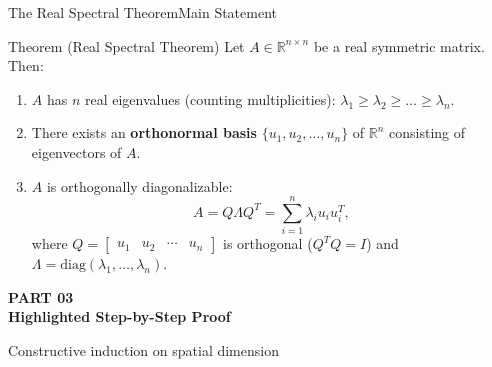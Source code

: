 \documentclass[10pt, aspectratio=169]{beamer}
\newcommand{\hl}[1]{{\color{amber}\textbf{#1}}}
\begin{document}
\begin{frame}{The Real Spectral Theorem}{Main Statement}
  \begin{maththeorem}{Theorem (Real Spectral Theorem)}
    Let $A \in \mathbb{R}^{n \times n}$ be a real symmetric matrix. Then:
    \begin{enumerate}
      \item $A$ has $n$ real eigenvalues (counting multiplicities): $\lambda_1 \ge \lambda_2 \ge \dots \ge \lambda_n$.
      \item There exists an \hl{orthonormal basis} $\{u_1, u_2, \dots, u_n\}$ of $\mathbb{R}^n$ consisting of eigenvectors of $A$.
      \item $A$ is orthogonally diagonalizable:
      \[
        A = Q \Lambda Q^T = \sum_{i=1}^n \lambda_i u_i u_i^T,
      \]
      where $Q = \begin{bmatrix} u_1 & u_2 & \cdots & u_n \end{bmatrix}$ is orthogonal ($Q^T Q = I$) and $\Lambda = \mathrm{diag}(\lambda_1, \dots, \lambda_n)$.
    \end{enumerate}
  \end{maththeorem}
\end{frame}

\begin{frame}[plain]
  \vspace*{1.8cm}
  \begin{center}
    {\color{teal}\small\bfseries PART 03} \\[0.2cm]
    {\color{navy}\huge\bfseries Highlighted Step-by-Step Proof} \\[0.3cm]
    \par\vspace{0.3cm}
    {\color{slate}\small Constructive induction on spatial dimension}
  \end{center}
\end{frame}
\end{document}
